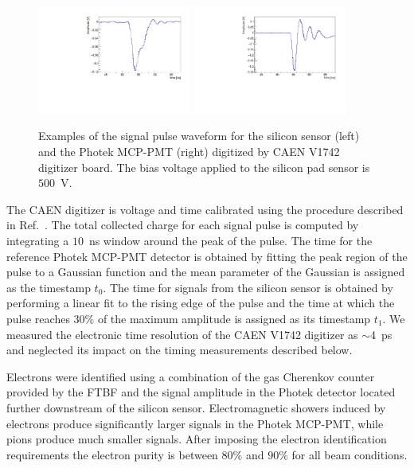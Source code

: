 \documentclass[12pt]{article}
\begin{document}
{\begin{figure}[htbp] 
\centering
\includegraphics[width=0.45\textwidth]{plots/ExampleSiliconPadPulse_6X0_16GeV.pdf} 
\includegraphics[width=0.45\textwidth]{plots/ExamplePhotekPulse.pdf} 
\caption{Examples of the signal pulse waveform for the silicon sensor (left) and
the Photek MCP-PMT (right) digitized by CAEN V1742 digitizer board. The bias
voltage applied to the silicon pad sensor is~$500$~V.} 
\label{fig:pulses} 
\end{figure} 

The CAEN digitizer is voltage and time calibrated using the  procedure
described in Ref.~\cite{Kim201467}. The total collected charge for each signal
pulse is computed by integrating a $10$~ns window around the peak of the pulse.
The time for the reference Photek MCP-PMT detector is obtained by fitting the
peak region of the pulse to a Gaussian function and the mean parameter of the
Gaussian is assigned as the timestamp $t_0$. The time for signals from the
silicon sensor is obtained by performing a linear fit to the rising edge of the
pulse and the time at which the pulse reaches 30\% of the maximum amplitude is
assigned as its timestamp $t_1$. We measured the electronic time resolution
of the CAEN V1742 digitizer as $\sim$4~ps and neglected its impact on the timing
measurements described below.

Electrons were identified using a combination of the gas Cherenkov counter
provided by the FTBF and the signal amplitude in the Photek detector located further
downstream of the silicon sensor. Electromagnetic showers induced by electrons
produce significantly larger signals in the Photek MCP-PMT, while pions produce
much smaller signals. After imposing the electron identification 
requirements the electron purity is between $80\%$ and $90\%$ for all beam
conditions. 

}
\end{document}
